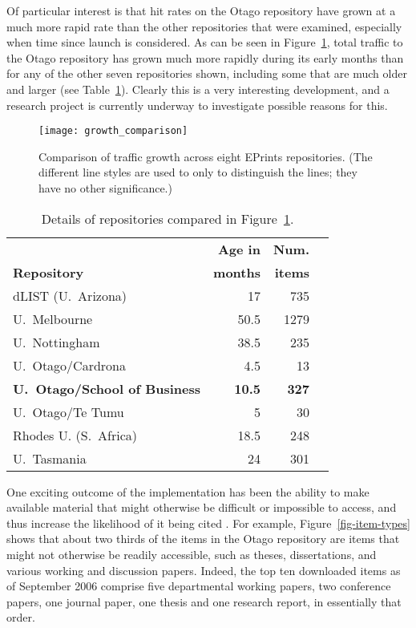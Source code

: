 \documentclass[12pt,pdftex,a4paper,titlepage]{article}
\begin{document}
Of particular interest is that hit rates on the Otago repository have grown at a much more rapid rate than the other repositories that were examined, especially when time since launch is considered. As can be seen in Figure~\ref{fig-growth-comparison}, total traffic to the Otago repository has grown much more rapidly during its early months than for any of the other seven repositories shown, including some that are much older and larger (see Table~\ref{tab-reopsitories}). Clearly this is a very interesting development, and a research project is currently underway to investigate possible reasons for this.


\begin{figure}
	\centering
	\texttt{[image: growth\_comparison]}
	\caption{Comparison of traffic growth across eight EPrints repositories. (The different line styles are used to only to distinguish the lines; they have no other significance.)}
	\label{fig-growth-comparison}
\end{figure}


\begin{table}
	\caption{Details of repositories compared in Figure~\ref{fig-growth-comparison}.}
	\label{tab-reopsitories}
	\begin{center}
		\begin{tabular}{lrrl}
													&	\textbf{Age in}	&	\textbf{Num.}	\\
			\textbf{Repository}						&	\textbf{months}	&	\textbf{items}	\\
			\hline
			dLIST (U.\ Arizona)						&	17				&	735	\\
			U.\ Melbourne							&	50.5			&	1279	\\
			U.\ Nottingham							&	38.5			&	235	\\
			U.\ Otago/Cardrona						&	4.5				&	13	\\
			\textbf{U.\ Otago/School of Business}	&	\textbf{10.5}	&	\textbf{327}	\\
			U.\ Otago/Te Tumu						&	5				&	30	\\
			Rhodes U. (S.\ Africa)					&	18.5			&	248	\\
			U.\ Tasmania							&	24				&	301	\\
		\end{tabular}
	\end{center}
\end{table}


One exciting outcome of the implementation has been the ability to make  available material that might otherwise be difficult or impossible to access, and thus increase the likelihood of it being cited \cite{Harn-S-2005-research,Hajj-C-2005-citation}. For example, Figure~\ref{fig-item-types} shows that about two thirds of the items in the Otago repository are items that might not otherwise be readily accessible, such as theses, dissertations, and various working and discussion papers. Indeed, the top ten downloaded items as of September 2006 comprise five departmental working papers, two conference papers, one journal paper, one thesis and one research report, in essentially that order.
\end{document}
